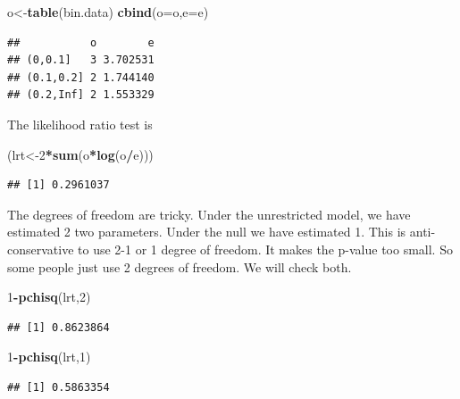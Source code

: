 \documentclass[]{book}
\newenvironment{Shaded}{\begin{snugshade}}{\end{snugshade}}
\newcommand{\KeywordTok}[1]{\textcolor[rgb]{0.13,0.29,0.53}{\textbf{#1}}}
\newcommand{\DataTypeTok}[1]{\textcolor[rgb]{0.13,0.29,0.53}{#1}}
\newcommand{\DecValTok}[1]{\textcolor[rgb]{0.00,0.00,0.81}{#1}}
\newcommand{\OperatorTok}[1]{\textcolor[rgb]{0.81,0.36,0.00}{\textbf{#1}}}
\newcommand{\NormalTok}[1]{#1}
\theoremstyle{definition}
\theoremstyle{definition}
\theoremstyle{definition}
\theoremstyle{remark}
\begin{document}
\begin{Shaded}
\begin{Highlighting}[]
\NormalTok{o<-}\KeywordTok{table}\NormalTok{(bin.data)}
\KeywordTok{cbind}\NormalTok{(}\DataTypeTok{o=}\NormalTok{o,}\DataTypeTok{e=}\NormalTok{e)}
\end{Highlighting}
\end{Shaded}

\begin{verbatim}
##           o        e
## (0,0.1]   3 3.702531
## (0.1,0.2] 2 1.744140
## (0.2,Inf] 2 1.553329
\end{verbatim}

The likelihood ratio test is

\begin{Shaded}
\begin{Highlighting}[]
\NormalTok{(lrt<-}\DecValTok{2}\OperatorTok{*}\KeywordTok{sum}\NormalTok{(o}\OperatorTok{*}\KeywordTok{log}\NormalTok{(o}\OperatorTok{/}\NormalTok{e)))}
\end{Highlighting}
\end{Shaded}

\begin{verbatim}
## [1] 0.2961037
\end{verbatim}

The degrees of freedom are tricky. Under the unrestricted model, we have
estimated 2 two parameters. Under the null we have estimated 1. This is
anti-conservative to use 2-1 or 1 degree of freedom. It makes the
p-value too small. So some people just use 2 degrees of freedom. We will
check both.

\begin{Shaded}
\begin{Highlighting}[]
\DecValTok{1}\OperatorTok{-}\KeywordTok{pchisq}\NormalTok{(lrt,}\DecValTok{2}\NormalTok{)}
\end{Highlighting}
\end{Shaded}

\begin{verbatim}
## [1] 0.8623864
\end{verbatim}

\begin{Shaded}
\begin{Highlighting}[]
\DecValTok{1}\OperatorTok{-}\KeywordTok{pchisq}\NormalTok{(lrt,}\DecValTok{1}\NormalTok{)}
\end{Highlighting}
\end{Shaded}

\begin{verbatim}
## [1] 0.5863354
\end{verbatim}
\end{document}
